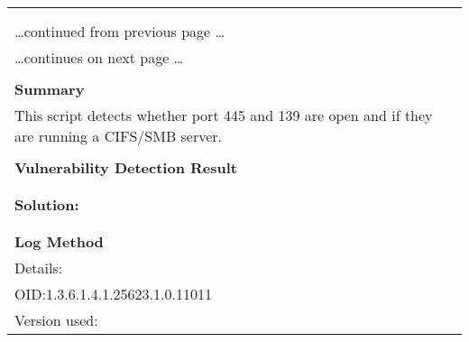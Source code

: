 \documentclass{article}
\begin{document}
\begin{longtable}{|p{}|}
\hline
\rowcolor{gvm_log}{\color{white}{Log (CVSS: 0.0) }}\\
\rowcolor{gvm_log}{\color{white}{NVT: SMB/CIFS Server Detection}}\\
\hline
\endfirsthead
\hfill\ldots continued from previous page \ldots \\
\hline
\endhead
\hline
\ldots continues on next page \ldots \\
\endfoot
\hline
\endlastfoot
\\
\textbf{Summary}\\
This script detects whether port 445 and 139 are open and
  if they are running a CIFS/SMB server.\\

        \hline
        \\
\textbf{Vulnerability Detection Result}\\
\rowcolor{white}{\verb=A CIFS server is running on this port=}\\

          \hline
          \\
\textbf{Solution:}\\
\\


        \hline
        \\
\textbf{Log Method}\\
Details:
\rowcolor{white}{\verb=SMB/CIFS Server Detection=}\\
OID:1.3.6.1.4.1.25623.1.0.11011\\
Version used:
\rowcolor{white}{\verb=2020-11-10T15:30:28Z=}\\
\end{longtable}
\end{document}
